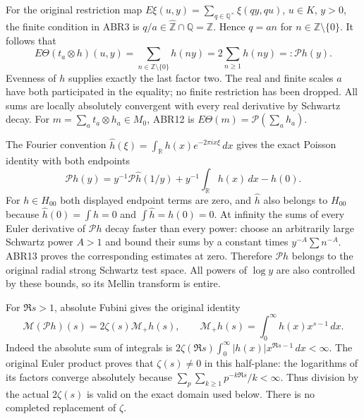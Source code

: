 For the original restriction map
$E\xi(u,y)=\sum_{q\in\mathbb Q^\times}\xi(qy,qu)$,
$u\in K$, $y>0$, the finite condition in ABR3 is
$q/a\in\widehat{\mathbb Z}\cap\mathbb Q=\mathbb Z$.
Hence $q=an$ for $n\in\mathbb Z\setminus\{0\}$. It follows that
\begin{equation}\tag{ABR12}
 E\Theta(t_a\otimes h)(u,y)
    =\sum_{n\in\mathbb Z\setminus\{0\}}h(ny)
    =2\sum_{n\ge1}h(ny)=:\mathcal P h(y).
\end{equation}
Evenness of $h$ supplies exactly the last factor two. The real
and finite scales $a$ have both participated in the equality;
no finite restriction has been dropped. All sums are locally
absolutely convergent with every real derivative by Schwartz decay.
For $m=\sum_at_a\otimes h_a\in M_0$, ABR12 is
$E\Theta(m)=\mathcal P(\sum_a h_a)$.

The Fourier convention
$\widehat h(\xi)=\int_{\mathbb R}h(x)e^{-2\pi ix\xi}\,dx$
gives the exact Poisson identity with both endpoints
\begin{equation}\tag{ABR13}
 \mathcal P h(y)
 =y^{-1}\mathcal P\widehat h(1/y)
     +y^{-1}\int_{\mathbb R}h(x)\,dx-h(0).
\end{equation}
For $h\in H_{00}$ both displayed endpoint terms are zero, and
$\widehat h$ also belongs to $H_{00}$ because
$\widehat h(0)=\int h=0$ and $\int\widehat h=h(0)=0$.
At infinity the sums of every Euler derivative of $\mathcal P h$
decay faster than every power: choose an arbitrarily large Schwartz
power $A>1$ and bound their sums by a constant times
$y^{-A}\sum n^{-A}$. ABR13 proves the corresponding estimates
at zero. Therefore $\mathcal P h$ belongs to the original radial
strong Schwartz test space. All powers of $\log y$ are also
controlled by these bounds, so its Mellin transform is entire.

For $\Re s>1$, absolute Fubini gives the original identity
\begin{equation}\tag{ABR14}
 \mathcal M(\mathcal P h)(s)
   =2\zeta(s)\mathcal M_+h(s),\qquad
 \mathcal M_+h(s)=\int_0^\infty h(x)x^{s-1}\,dx.
\end{equation}
Indeed the absolute sum of integrals is
$2\zeta(\Re s)\int_0^\infty|h(x)|x^{\Re s-1}\,dx<\infty$.
The original Euler product proves that $\zeta(s)\ne0$ in this
half-plane: the logarithms of its factors converge absolutely
because $\sum_p\sum_{k\ge1}p^{-k\Re s}/k<\infty$.
Thus division by the actual $2\zeta(s)$ is valid on the exact
domain used below. There is no completed replacement of $\zeta$.

